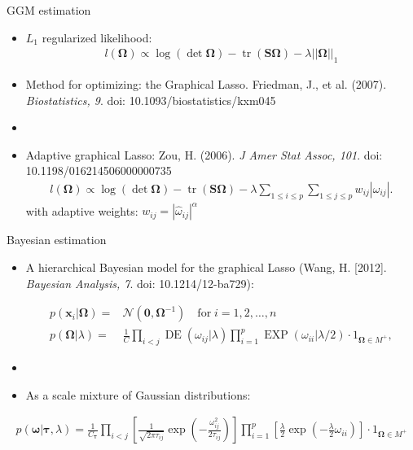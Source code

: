 \documentclass[xcolor=dvipsnames]{beamer}
\DeclareMathOperator{\tr}{tr}
\DeclareMathOperator{\DE}{DE}
\DeclareMathOperator{\EXP}{EXP}
\begin{document}
\begin{frame}{GGM estimation}
	\vspace{-15.5pt}
	\begin{itemize}
		\item $L_1$ regularized likelihood:
		\begin{align*}
		l(\boldsymbol{\Omega})\propto\log (\det \boldsymbol{\Omega})-\tr \left( \textbf{S} \boldsymbol{\Omega} \right)-\lambda ||\boldsymbol{\Omega}||_1
		\end{align*}\pause
		\item Method for optimizing: the Graphical Lasso. Friedman, J., et al. (2007). \emph{Biostatistics, 9}. doi: 10.1093/biostatistics/kxm045 \pause
		\item[]
		\item Adaptive graphical Lasso: Zou, H. (2006).  \emph{J Amer Stat Assoc, 101}. doi: 10.1198/016214506000000735 
		\begin{align*}
				l(\boldsymbol{\Omega})\propto \log(\det \boldsymbol{\Omega})-\tr \left(\mathbf{S} \boldsymbol{\Omega}\right) - \lambda \sum_{1\leq i \leq p} \sum_{1 \leq j \leq p} w_{ij} |\omega_{ij}|.
		\end{align*}
		with adaptive weights: $w_{ij}=|\hat{\omega}_{ij}|^\alpha$
	\end{itemize}
\end{frame}

\begin{frame}{Bayesian estimation}
	\vspace{-5.5pt}
\begin{itemize}
	\item A hierarchical Bayesian model for the graphical Lasso (Wang, H. [2012]. \emph{Bayesian Analysis, 7}. doi: 10.1214/12-ba729): 
	
		\begin{align*}
		p(\textbf{x}_i|\boldsymbol{\Omega}) =& \mathcal{N}(\textbf{0},\boldsymbol{\Omega}^{-1}) \quad \text{for} \; i=1,2,\hdots,n\\
		p(\boldsymbol{\Omega}|\lambda) =& \frac{1}{C} \prod_{i<j} \DE(\omega_{ij}|\lambda) \prod_{i=1}^{p} \EXP (\omega_{ii} | \lambda / 2) \cdot 1_{\boldsymbol{\Omega}\in M^+},
		\end{align*} \pause
	\item[]
	\item As a scale mixture of Gaussian distributions:
\end{itemize}
		\begin{align*}
		p(\boldsymbol{\omega}| \boldsymbol{\tau},\lambda)=\frac{1}{C_{\boldsymbol{\tau}}} \prod_{i<j} \left[ \frac{1}{\sqrt{2\pi \tau_{ij}}} \exp \left(- \frac{\omega_{ij}^2}{2\tau_{ij}}\right) \right] 
		\prod_{i=1}^{p}  \left[\frac{\lambda}{2} \exp \left(-\frac{\lambda}{2}\omega_{ii} \right)\right] \cdot 1_{\boldsymbol{\Omega}\in M^+}
		\end{align*}
\end{frame}
\end{document}
